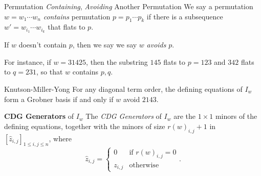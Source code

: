 \documentclass[co439]{subfiles}
\begin{document}
    \begin{definition}{Permutation \emph{Containing}, \emph{Avoiding} Another Permutation}
        We say a permutation $w = w_1\cdots w_n$ \emph{contains} permutation $p = p_1\cdots p_k$ if there is a subsequence $w' = w_{i_1}\cdots w_{i_k}$ that flats to $p$. 

        If $w$ doesn't contain $p$, then we say we say $w$ \emph{avoids} $p$.
    \end{definition}

    \np For instance, if $w=31425$, then the substring $145$ flats to $p=123$ and $342$ flats to $q=231$, so that $w$ contains $p,q$. 

    \begin{theorem}{Knutson-Miller-Yong}
        For any diagonal term order, the defining equations of $I_w$ form a Grobner basis if and only if $w$ avoid $2143$. \footnotemark
        
        \noindent
        \begin{minipage}{\textwidth}
        \end{minipage}
    \end{theorem}

    \rruleline

    \begin{definition}{\textbf{CDG Generators} of $I_w$}
        The \emph{CDG Generators} of $I_w$ are the $1\times 1$ minors of the defining equations, together with the minors of size $r\left( w \right)_{i,j} + 1$ in $\left[ \hat{z}_{i,j} \right]_{1\leq i,j\leq n}$, where
        \begin{equation*}
            \hat{z}_{i,j} = 
            \begin{cases} 0 &\text{if }r\left( w \right)_{i,j} = 0 \\ z_{i,j}&\text{otherwise} \end{cases}.
        \end{equation*}
    \end{definition}
\end{document}
